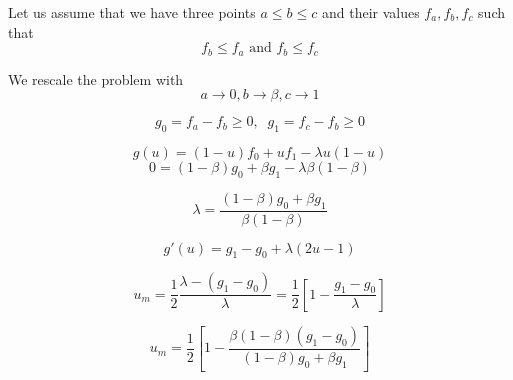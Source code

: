 \documentclass[aps,12pt]{revtex4}
\begin{document}
Let us assume that we have three points $a\leq b \leq c$ and their values
$f_a,f_b,f_c$ such that
\begin{equation}
	f_b \leq f_a \text{ and } f_b \leq f_c
\end{equation} 

We rescale the problem with
$$
	a \to 0, b \to \beta, c \to 1
$$	

$$
	g_0 = f_a - f_b \geq 0, \;\; g_1 = f_c - f_b \geq 0
$$

$$
	g(u) = (1-u) f_0 + u f_1 - \lambda u(1-u)
$$
$$
	0 = (1-\beta) g_0 + \beta g_1 - \lambda \beta(1-\beta)
$$

$$
	\lambda = \dfrac{(1-\beta) g_0 + \beta g_1 }{\beta(1-\beta)}
$$

$$
	g'(u) = g_1-g_0 + \lambda (2u-1)
$$

$$
	u_m = \dfrac{1}{2} \dfrac{\lambda - (g_1-g_0)}{\lambda} = \dfrac{1}{2}\left[ 1 - \dfrac{g_1-g_0}{\lambda} \right]
$$

$$
	u_m = \frac{1}{2} \left[ 1 - \dfrac{ \beta(1-\beta) (g_1-g_0) }{ (1-\beta) g_0 + \beta g_1 } \right]
$$
\end{document}
